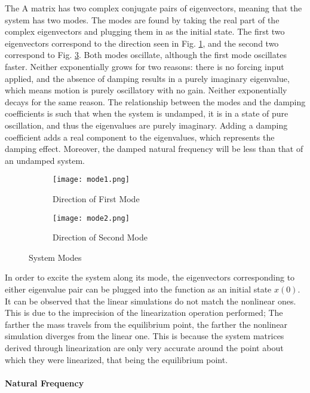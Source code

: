 \documentclass[../notes.tex]{subfiles}
\begin{document}
The A matrix has two complex conjugate pairs of eigenvectors, meaning that the system has two modes. The modes are found by taking the real part of the complex eigenvectors and plugging them in as the initial state. The first two eigenvectors correspond to the direction seen in Fig. \ref{fig:mode1}, and the second two correspond to Fig. \ref{fig:mode2}. Both modes oscillate, although the first mode oscillates faster. Neither exponentially grows for two reasons: there is no forcing input applied, and the absence of damping results in a purely imaginary eigenvalue, which means motion is purely oscillatory with no gain. Neither exponentially decays for the same reason. The relationship between the modes and the damping coefficients is such that when the system is undamped, it is in a state of pure oscillation, and thus the eigenvalues are purely imaginary. Adding a damping coefficient adds a real component to the eigenvalues, which represents the damping effect. Moreover, the damped natural frequency will be less than that of an undamped system.

\begin{figure}[H]
    \centering
    \begin{subfigure}{.5\textwidth}
        \centering
        \texttt{[image: mode1.png]}
        \caption{Direction of First Mode}
        \label{fig:mode1}
    \end{subfigure}%
    \begin{subfigure}{.5\textwidth}
        \centering
        \texttt{[image: mode2.png]}
        \caption{Direction of Second Mode}
        \label{fig:mode2}
    \end{subfigure}
    
    \caption{System Modes}
\end{figure}

In order to excite the system along its mode, the eigenvectors corresponding to either eigenvalue pair can be plugged into the function as an initial state $x(0)$. It can be observed that the linear simulations do not match the nonlinear ones. This is due to the imprecision of the linearization operation performed; The farther the mass travels from the equilibrium point, the farther the nonlinear simulation diverges from the linear one. This is because the system matrices derived through linearization are only very accurate around the point about which they were linearized, that being the equilibrium point.

\paragraph{Natural Frequency}
\end{document}
